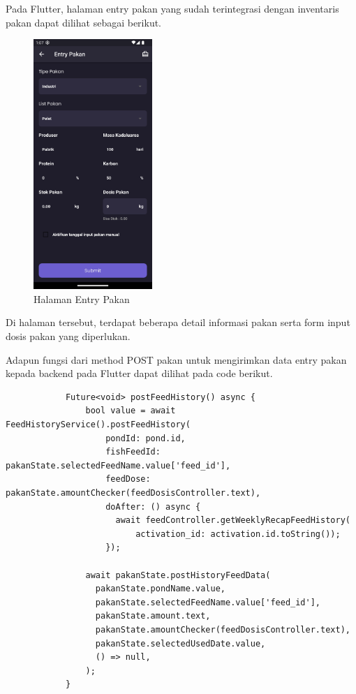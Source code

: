 \begin{spacing}{1.5}
\begin{enumerate}
		Pada Flutter, halaman entry pakan yang sudah terintegrasi dengan inventaris pakan dapat dilihat sebagai berikut.

		\begin{figure}[H]
			\centering
			\includegraphics[width=0.4\textwidth]{gambar/sprint4/entry_2.png}
			\caption{Halaman Entry Pakan}
		\end{figure}


		Di halaman tersebut, terdapat beberapa detail informasi pakan serta form input dosis pakan yang diperlukan.
		
		Adapun fungsi dari method POST pakan untuk mengirimkan data entry pakan kepada backend pada Flutter dapat dilihat pada code berikut.

		\begin{lstlisting}
			Future<void> postFeedHistory() async {
				bool value = await FeedHistoryService().postFeedHistory(
					pondId: pond.id,
					fishFeedId: pakanState.selectedFeedName.value['feed_id'],
					feedDose: pakanState.amountChecker(feedDosisController.text),
					doAfter: () async {
					  await feedController.getWeeklyRecapFeedHistory(
						  activation_id: activation.id.toString());
					});
			
				await pakanState.postHistoryFeedData(
				  pakanState.pondName.value,
				  pakanState.selectedFeedName.value['feed_id'],
				  pakanState.amount.text,
				  pakanState.amountChecker(feedDosisController.text),
				  pakanState.selectedUsedDate.value,
				  () => null,
				);
			}
		\end{lstlisting}


\end{enumerate}
\end{spacing}
